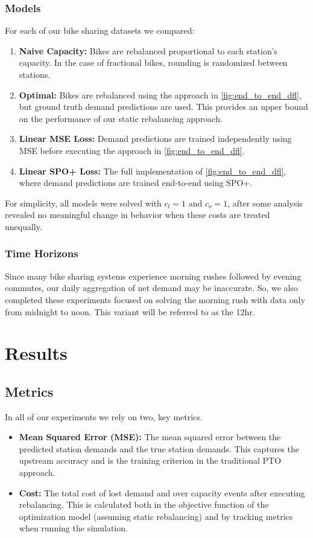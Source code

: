 \documentclass{article}
\begin{document}
\subsubsection{Models}
For each of our bike sharing datasets we compared: 
\begin{enumerate}
    \item \textbf{Naive Capacity:} Bikes are rebalanced proportional to each station's capacity. In the case of fractional bikes, rounding is randomized between stations.
    \item \textbf{Optimal:} Bikes are rebalanced using the approach in \cref{fig:end_to_end_dfl}, but ground truth demand predictions are used. This provides an upper bound on the performance of our static rebalancing approach.
    \item \textbf{Linear MSE Loss:} Demand predictions are trained independently using MSE before executing the approach in \cref{fig:end_to_end_dfl}.
    \item \textbf{Linear SPO+ Loss:} The full implementation of \cref{fig:end_to_end_dfl}, where demand predictions are trained end-to-end using SPO+.
\end{enumerate}

For simplicity, all models were solved with $c_l = 1$ and $c_o = 1$, after some analysis revealed no meaningful change in behavior when these costs are treated unequally. 
\subsubsection{Time Horizons}
Since many bike sharing systems experience morning rushes followed by evening commutes, our daily aggregation of net demand may be inaccurate. 
So, we also completed these experiments focused on solving the morning rush with data only from midnight to noon. This variant will be referred to as the 12hr. 

\section{Results}
\subsection{Metrics}
In all of our experiments we rely on two, key metrics.
\begin{itemize}
    \item \textbf{Mean Squared Error (MSE):} The mean squared error between the predicted station demands and the true station demands. This captures the upstream accuracy and is the training criterion in the traditional PTO approach.
    \item \textbf{Cost:} The total cost of lost demand and over capacity events after executing rebalancing. This is calculated both in the objective function of the optimization model (assuming static rebalancing) and by tracking metrics when running the simulation.
\end{itemize}
\end{document}
